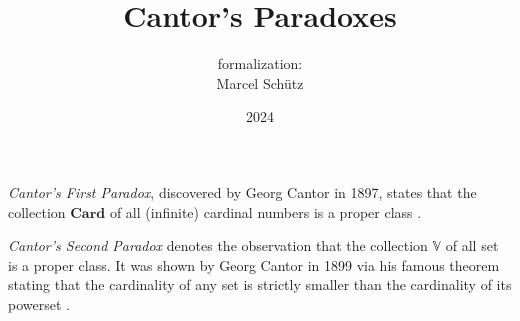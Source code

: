 \documentclass{article}
\title{Cantor's Paradoxes}
\author{\Naproche formalization: \\[0.5em]Marcel Schütz}
\date{2024}
\newcommand\Card{\textbf{Card}}
\newcommand\V{\mathbb V}
\begin{document}
  \maketitle

  \noindent \emph{Cantor's First Paradox}, discovered by Georg Cantor in 1897,
  states that the collection $\Card$ of all (infinite) cardinal numbers is a
  proper class \cite[chapter 156]{Cantor1991}.


  \emph{Cantor's Second Paradox} denotes the observation that the collection
  $\V$ of all set is a proper class.
  It was shown by Georg Cantor in 1899 via his famous theorem stating that the
  cardinality of any set is strictly smaller than the cardinality of its 
  powerset \cite[chapter 163]{Cantor1991}.


  \printbibliography
\end{document}
